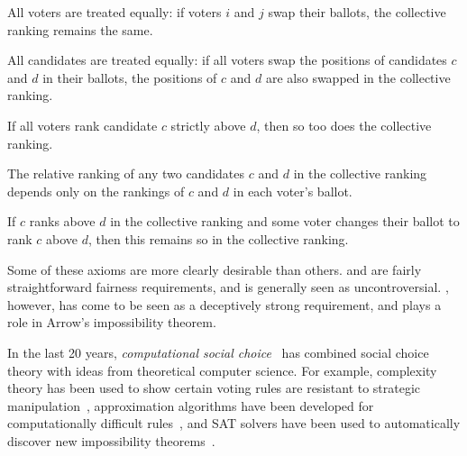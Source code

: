 \begin{axiomlist}

    \begin{axiom}
        All voters are treated equally: if voters $i$ and $j$ swap their
        ballots, the collective ranking remains the same.
    \end{axiom}

    \begin{axiom}
        All candidates are treated equally: if all voters swap the positions of
        candidates $c$ and $d$ in their ballots, the positions of $c$ and $d$
        are also swapped in the collective ranking.
    \end{axiom}

    \begin{axiom}
        If all voters rank candidate $c$ strictly above $d$, then so too does
        the collective ranking.
    \end{axiom}

    \begin{axiom}
        The relative ranking of any two candidates $c$ and $d$ in the
        collective ranking depends only on the rankings of $c$ and $d$ in each
        voter's ballot.
    \end{axiom}

    \begin{axiom}
        If $c$ ranks above $d$ in the collective ranking and some voter changes
        their ballot to rank $c$ above $d$, then this remains so in the
        collective ranking.
    \end{axiom}

\end{axiomlist}

Some of these axioms are more clearly desirable than others.
 and  are fairly straightforward
fairness requirements\footnotemark{}, and  is
generally seen as uncontroversial. , however, has come to be seen
as a deceptively strong requirement, and plays a role in Arrow's impossibility
theorem.


In the last 20 years, \emph{computational social choice}~\cite{moulin_2016} has
combined social choice theory with ideas from theoretical computer science. For
example, complexity theory has been used to show certain voting rules are
resistant to strategic manipulation~\cite{conitzer_manipulation_2016},
approximation algorithms have been developed for computationally difficult
rules~\cite{brandt2016a}, and SAT solvers have been used to automatically
discover new impossibility theorems~\cite{endriss2020analysis}.


